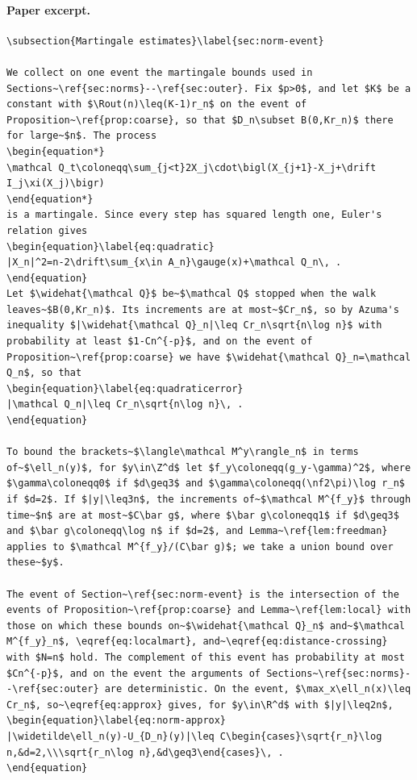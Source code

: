 \paragraph{Paper excerpt.}
\begin{verbatim}
\subsection{Martingale estimates}\label{sec:norm-event}

We collect on one event the martingale bounds used in Sections~\ref{sec:norms}--\ref{sec:outer}. Fix $p>0$, and let $K$ be a constant with $\Rout(n)\leq(K-1)r_n$ on the event of Proposition~\ref{prop:coarse}, so that $D_n\subset B(0,Kr_n)$ there for large~$n$. The process
\begin{equation*}
\mathcal Q_t\coloneqq\sum_{j<t}2X_j\cdot\bigl(X_{j+1}-X_j+\drift I_j\xi(X_j)\bigr)
\end{equation*}
is a martingale. Since every step has squared length one, Euler's relation gives
\begin{equation}\label{eq:quadratic}
|X_n|^2=n-2\drift\sum_{x\in A_n}\gauge(x)+\mathcal Q_n\, .
\end{equation}
Let $\widehat{\mathcal Q}$ be~$\mathcal Q$ stopped when the walk leaves~$B(0,Kr_n)$. Its increments are at most~$Cr_n$, so by Azuma's inequality $|\widehat{\mathcal Q}_n|\leq Cr_n\sqrt{n\log n}$ with probability at least $1-Cn^{-p}$, and on the event of Proposition~\ref{prop:coarse} we have $\widehat{\mathcal Q}_n=\mathcal Q_n$, so that
\begin{equation}\label{eq:quadraticerror}
|\mathcal Q_n|\leq Cr_n\sqrt{n\log n}\, .
\end{equation}

To bound the brackets~$\langle\mathcal M^y\rangle_n$ in terms of~$\ell_n(y)$, for $y\in\Z^d$ let $f_y\coloneqq(g_y-\gamma)^2$, where $\gamma\coloneqq0$ if $d\geq3$ and $\gamma\coloneqq(\nf2\pi)\log r_n$ if $d=2$. If $|y|\leq3n$, the increments of~$\mathcal M^{f_y}$ through time~$n$ are at most~$C\bar g$, where $\bar g\coloneqq1$ if $d\geq3$ and $\bar g\coloneqq\log n$ if $d=2$, and Lemma~\ref{lem:freedman} applies to $\mathcal M^{f_y}/(C\bar g)$; we take a union bound over these~$y$.

The event of Section~\ref{sec:norm-event} is the intersection of the events of Proposition~\ref{prop:coarse} and Lemma~\ref{lem:local} with those on which these bounds on~$\widehat{\mathcal Q}_n$ and~$\mathcal M^{f_y}_n$, \eqref{eq:localmart}, and~\eqref{eq:distance-crossing} with $N=n$ hold. The complement of this event has probability at most $Cn^{-p}$, and on the event the arguments of Sections~\ref{sec:norms}--\ref{sec:outer} are deterministic. On the event, $\max_x\ell_n(x)\leq Cr_n$, so~\eqref{eq:approx} gives, for $y\in\R^d$ with $|y|\leq2n$,
\begin{equation}\label{eq:norm-approx}
|\widetilde\ell_n(y)-U_{D_n}(y)|\leq C\begin{cases}\sqrt{r_n}\log n,&d=2,\\\sqrt{r_n\log n},&d\geq3\end{cases}\, .
\end{equation}
\end{verbatim}
